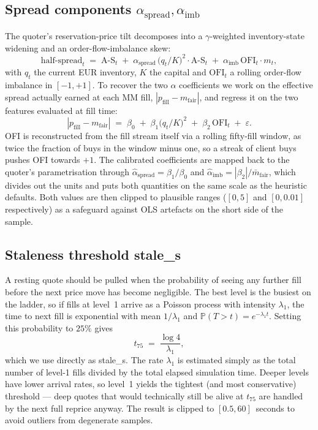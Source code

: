 \subsection{Spread components $\alpha_{\text{spread}},
\alpha_{\text{imb}}$}

The quoter's reservation-price tilt decomposes into a
$\gamma$-weighted inventory-state widening and an order-flow-imbalance
skew:
\[
\text{half-spread}_t \;=\; \text{A-S}_t
\;+\; \alpha_{\text{spread}}\,\bigl(q_t/K\bigr)^2 \cdot \text{A-S}_t
\;+\; \alpha_{\text{imb}}\,\text{OFI}_t \cdot m_t,
\]
with $q_t$ the current EUR inventory, $K$ the capital and $\text{OFI}_t$
a rolling order-flow imbalance in $[-1, +1]$. To recover the two
$\alpha$ coefficients we work on the effective spread actually earned
at each MM fill, $|p_{\text{fill}} - m_{\text{fair}}|$, and regress it
on the two features evaluated at fill time:
\[
|p_{\text{fill}} - m_{\text{fair}}|
\;=\; \beta_0
\;+\; \beta_1 \bigl(q_t/K\bigr)^2
\;+\; \beta_2 \,\text{OFI}_t
\;+\; \varepsilon.
\]
OFI is reconstructed from the fill stream itself via a rolling
fifty-fill window, as twice the fraction of buys in the window minus
one, so a streak of client buys pushes OFI towards $+1$. The
calibrated coefficients are mapped back to the quoter's
parametrisation through $\hat\alpha_{\text{spread}} = \beta_1 / \beta_0$
and $\hat\alpha_{\text{imb}} = |\beta_2| / \bar m_{\text{fair}}$,
which divides out the units and puts both quantities on the same
scale as the heuristic defaults. Both values are then clipped to
plausible ranges ($[0, 5]$ and $[0, 0.01]$ respectively) as a
safeguard against OLS artefacts on the short side of the sample.

\subsection{Staleness threshold stale\_s}

A resting quote should be pulled when the probability of seeing any
further fill before the next price move has become negligible. The
best level is the busiest on the ladder, so if fills at level~1
arrive as a Poisson process with intensity $\lambda_1$, the time to
next fill is exponential with mean $1/\lambda_1$ and
$\mathbb{P}(T > t) = e^{-\lambda_1 t}$. Setting this probability to
$25\%$ gives
\[
t_{75} \;=\; \frac{\log 4}{\lambda_1},
\]
which we use directly as stale\_s. The rate $\lambda_1$ is estimated
simply as the total number of level-1 fills divided by the total
elapsed simulation time. Deeper levels have lower arrival rates, so
level~1 yields the tightest (and most conservative) threshold ---
deep quotes that would technically still be alive at $t_{75}$ are
handled by the next full reprice anyway. The result is clipped to
$[0.5, 60]$~seconds to avoid outliers from degenerate samples.


